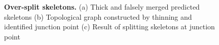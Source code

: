 \begin{figure}[t]
\begin{subfigure}[b]{\hwidth}
		\caption{\label{fig:method_proposal_c}}
	\end{subfigure}
	\caption{{\bf Over-split skeletons.} (a) Thick and falsely merged predicted skeletons (b) Topological graph constructed by thinning and identified junction point (c) Result of splitting skeletons at junction point}
	\label{fig:method_proposal}
	\vspace{-0.1in}
\end{figure}


